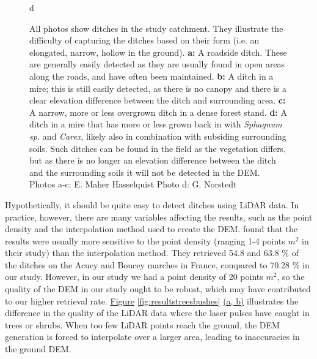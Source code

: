 \documentclass[11pt, review]{elsarticle} %
\begin{document}
\begin{figure} [!htb]
    d{
        }
    \caption{All photos show ditches in the study catchment. They illustrate the difficulty of capturing the ditches based on their form (i.e. an elongated, narrow, hollow in the ground). \textbf{a: }A roadside ditch. These are generally easily detected as they are usually found in open areas along the roads, and have often been maintained. \textbf{b: }A ditch in a mire; this is still easily detected, as there is no canopy and there is a clear elevation difference between the ditch and surrounding area. \textbf{c: }A narrow, more or less  overgrown ditch in a dense forest stand. \textbf{d: }A ditch in a mire that has more or less grown back in with \textit{Sphagnum sp.} and \textit{Carex}, likely also in combination with subsiding surrounding soils. Such ditches can be found in the field as the vegetation differs, but as there is no longer an elevation difference between the ditch and the surrounding soils it will not be detected in the DEM. Photos a-c: E. Maher Hasselquist  Photo d: G. Norstedt}
    \label{fig:ditchpictures}
\end{figure}

Hypothetically, it should be quite easy to detect ditches using LiDAR data. In practice, however, there are many variables affecting the results, such as the point density and the interpolation method used to create the DEM. \citet{rapinel} found that the results were usually more sensitive to the point density (ranging 1-4 points $m^{2}$ in their study) than the interpolation method. They retrieved 54.8 and 63.8 \% of the ditches on the Acuey and Boucey marches in France, compared to 70.28 \% in our study. However, in our study we had a point density of 20 points $m^{2}$, so the quality of the DEM in our study ought to be robust, which may have contributed to our higher retrieval rate. \hyperref[fig:resultstreesbushes]{Figure} \ref{fig:resultstreesbushes} \hyperref[fig:resultstreesbushes]{(a, b)} illustrates the difference in the quality of the LiDAR data where the laser pulses have caught in trees or shrubs. When too few LiDAR points reach the ground, the DEM generation is forced to interpolate over a larger area, leading to inaccuracies in the ground DEM.
\end{document}
